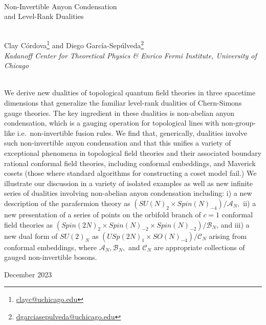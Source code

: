 \documentclass[11pt]{article}
\numberwithin{equation}{section}
\newcommand{\mytitlefont}{\fontseries{mx}\selectfont}
\begin{document}
\begin{titlepage}

\begin{center}

~\\[2cm]

{\fontsize{20pt}{0pt} \mytitlefont Non-Invertible Anyon Condensation\\   and Level-Rank Dualities}

~\\[0.1cm]



Clay C\'ordova\footnote{\href{clayc@uchicago.edu}{clayc@uchicago.edu}} and 
Diego Garc\'{i}a-Sep\'{u}lveda\footnote{\href{dgarciasepulveda@uchicago.edu}{dgarciasepulveda@uchicago.edu}} 
~\\[0.1cm]

{\it Kadanoff Center for Theoretical Physics \& Enrico Fermi Institute, University of Chicago}\\[4pt]



~\\[15pt]

\end{center}

\noindent We derive new dualities of topological quantum field theories in three spacetime dimensions that generalize the familiar level-rank dualities of Chern-Simons gauge theories. The key ingredient in these dualities is non-abelian anyon condensation, which is a gauging operation for topological lines with non-group-like i.e.\ non-invertible fusion rules.  We find that, generically, dualities involve such non-invertible anyon condensation and that this unifies a variety of exceptional phenomena in topological field theories and their associated boundary rational conformal field theories, including conformal embeddings, and Maverick cosets (those where standard algorithms for constructing a coset model fail.)  We illustrate our discussion in a variety of isolated examples as well as new infinite series of dualities involving non-abelian anyon condensation including: i) a new description of the parafermion theory as $(SU(N)_{2} \times Spin(N)_{-4})/\mathcal{A}_{N},$  ii) a new presentation of a series of points on the orbifold branch of $c=1$ conformal field theories as $(Spin(2N)_{2} \times Spin(N)_{-2} \times Spin(N)_{-2})/\mathcal{B}_{N}$, and iii) a new dual form of $SU(2)_{N}$ as $(USp(2N)_{1} \times SO(N)_{-4})/\mathcal{C}_{N}$ arising from conformal embeddings, where $\mathcal{A}_{N}, \mathcal{B}_{N},$ and $\mathcal{C}_{N}$ are appropriate collections of gauged non-invertible bosons.




\vfill

\begin{flushleft}
December 2023
\end{flushleft}

\end{titlepage}
\end{document}

